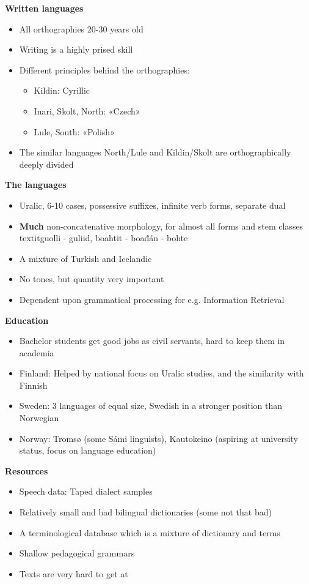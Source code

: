 \documentclass[landscape,english,11pt]{seminar}
\begin{document}
\begin{slide}
\newslide
\textbf{Written languages}
\begin{itemize}
\item All orthographies 20-30 years old
\item Writing is a highly prised skill
\item Different principles behind the orthographies:
\begin{itemize}
\item Kildin: Cyrillic
\item Inari, Skolt, North: «Czech»
\item Lule, South: «Polish»
\end{itemize}
\item The similar languages North/Lule and Kildin/Skolt are orthographically deeply divided
\end{itemize}

\newslide
\textbf{The languages}
\begin{itemize}
\item Uralic, 6-10 cases, possessive suffixes, infinite verb forms, separate dual
\item \textbf{Much} non-concatenative morphology, for almost all forms and stem classes textit{guolli - guliid, boahtit - boađán - bohte }
\item A mixture of Turkish and Icelandic
\item No tones, but quantity very important
\item Dependent upon grammatical processing for e.g. Information Retrieval 
\end{itemize}


\newslide
\textbf{Education}
\begin{itemize}
\item Bachelor students get good jobs as civil servants, hard to keep them in academia
\item Finland: Helped by national focus on Uralic studies, and the similarity with Finnish
\item Sweden: 3 languages of equal size, Swedish in a stronger position than Norwegian
\item Norway: Tromsø (some Sámi linguists), Kautokeino (aspiring at university status, focus on language education)
\end{itemize}

\newslide
\textbf{Resources}
\begin{itemize}
\item Speech data: Taped dialect samples
\item Relatively small and bad bilingual dictionaries (some not that bad)
\item A terminological database which is a mixture of dictionary and terms
\item Shallow pedagogical grammars
\item Texts are very hard to get at
\end{itemize}


\end{slide}
\end{document}

